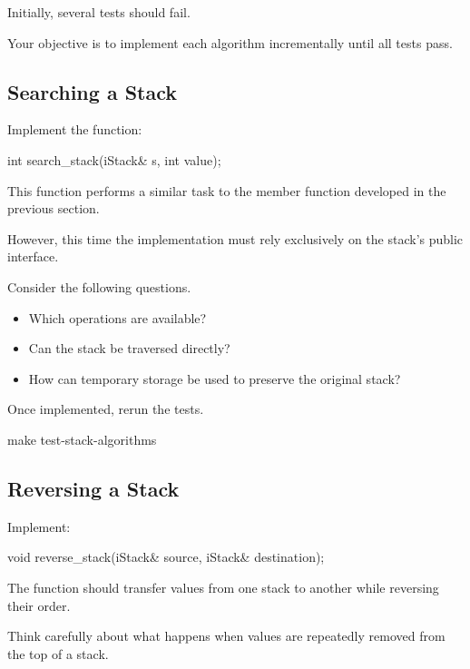 \documentclass{csc2059practical}
\begin{document}
Initially, several tests should fail.

Your objective is to implement each algorithm incrementally until all
tests pass.

\subsection*{Searching a Stack}

Implement the function:

\begin{cppcode}
int search_stack(iStack& s, int value);
\end{cppcode}

This function performs a similar task to the member function developed
in the previous section.

However, this time the implementation must rely exclusively on the
stack's public interface.

Consider the following questions.

\begin{itemize}

\item Which operations are available?

\item Can the stack be traversed directly?

\item How can temporary storage be used to preserve the original stack?

\end{itemize}

Once implemented, rerun the tests.

\begin{terminal}
make test-stack-algorithms
\end{terminal}

\subsection*{Reversing a Stack}

Implement:

\begin{cppcode}
void reverse_stack(iStack& source,
                   iStack& destination);
\end{cppcode}

The function should transfer values from one stack to another while
reversing their order.

Think carefully about what happens when values are repeatedly removed
from the top of a stack.
\end{document}
